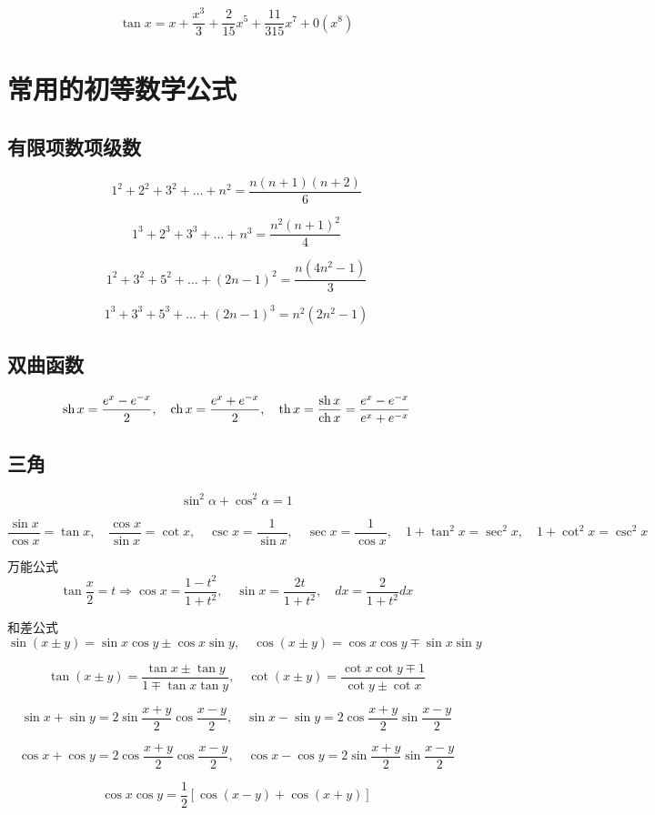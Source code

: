 \documentclass{book}
\begin{document}
$$
\tan x=
x+\frac{ x^3}{3}+\frac{2}{15}x^5+\frac{ 11}{315}x^7+0(x^8)
$$


\section{常用的初等数学公式}
\subsection{有限项数项级数}
$$
1^2 + 2^2 +3^2+\ldots+n^2=\frac{ n(n+1)(n+2)}{6}
$$

$$
1^3 + 2^3 +3^3+\ldots+n^3=\frac{ n^2(n+1)^2}{4}
$$

$$
1^2+3^2+5^2+\ldots+(2n-1)^2=\frac{n(4n^2-1)}{3}
$$

$$
1^3 + 3^3 +5^3+\ldots+(2n-1)^3=n^2(2n^2-1)
$$

\subsection{双曲函数}
$$
\operatorname{sh} x=\frac{e^x - e^{-x}}{2}, \quad \operatorname{ch} x=\frac{e^x+e^{-x}}{2}, \quad \operatorname{th} x = \frac{ \operatorname{sh} x}{\operatorname{ch} x}=\frac{e^x-e^{-x}}{e^x + e^{-x}}
$$

\subsection{三角}
$$
\sin ^2 \alpha + \cos^2 \alpha=1
$$

$$
\frac{ \sin x}{\cos x}=\tan x, \quad
\frac{ \cos x}{\sin x}=\cot x, \quad
\csc x=\frac{1}{\sin x}, \quad
\sec x=\frac{ 1}{\cos x}, \quad
1+\tan^2 x=\sec^2 x,\quad
1+\cot^2 x=\csc^2 x
$$

万能公式
$$
\tan \frac{x}{2}=t \Rightarrow
\cos x =\frac{ 1-t^2}{1+t^2},\quad
\sin x=\frac{2t}{1+t^2},\quad
dx=\frac{2}{1+t^2}dx
$$

和差公式
$$
\sin(x\pm y)=\sin x \cos y \pm \cos x \sin y,\quad \cos(x \pm y)=\cos x \cos y \mp \sin x \sin y
$$

$$
\tan(x \pm y)=\frac{\tan x \pm \tan y}{1 \mp \tan x \tan y}, \quad
\cot (x\pm y)=\frac{\cot x \cot y \mp 1}{\cot y \pm \cot x}
$$

$$
\sin x+\sin y=2\sin \frac{x+y}{2} \cos \frac{ x -y }{2}, \quad
\sin x-\sin y=2\cos \frac{x+y}{2} \sin \frac{ x -y }{2}
$$

$$
\cos x+\cos y=2\cos \frac{x+y}{2} \cos \frac{ x -y }{2}, \quad
\cos x-\cos y=2\sin \frac{x+y}{2} \sin \frac{ x -y }{2}
$$

$$
\cos x \cos y=\frac{ 1}{2}[\cos(x-y)+\cos(x+y)]
$$
\end{document}
